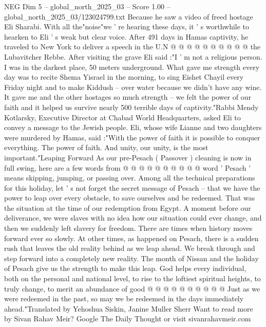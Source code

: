 \begin{textsample}{NEG Dim 5 – global\_north\_2025\_03 – Score 1.00 – global\_north\_2025\_03/123024799.txt}
Because he saw a video of freed hostage Eli Sharabi.
With all the"noise"we ' re hearing these days, it ' s worthwhile to hearken to Eli ' s weak but clear voice.
After 491 days in Hamas captivity, he traveled to New York to deliver a speech in the U.N @ @ @ @ @ @ @ @ @ @ the Lubavitcher Rebbe.
After visiting the grave Eli said :"I ' m not a religious person.
I was in the darkest place, 50 meters underground.
What gave me strength every day was to recite Shema Yisrael in the morning, to sing Eishet Chayil every Friday night and to make Kiddush -- over water because we didn't have any wine.
It gave me and the other hostages so much strength -- we felt the power of our faith and it helped us survive nearly 500 terrible days of captivity."Rabbi Mendy Kotlarsky, Executive Director at Chabad World Headquarters, asked Eli to convey a message to the Jewish people.
Eli, whose wife Lianne and two daughters were murdered by Hamas, said :"With the power of faith it is possible to conquer everything.
The power of faith.
And unity, our unity, is the most important."Leaping Forward As our pre-Pesach ( Passover ) cleaning is now in full swing, here are a few words from @ @ @ @ @ @ @ @ @ @ word ' Pesach ' means skipping, jumping, or passing over.
Among all the technical preparations for this holiday, let ' s not forget the secret message of Pesach -- that we have the power to leap over every obstacle, to save ourselves and be redeemed.
That was the situation at the time of our redemption from Egypt.
A moment before our deliverance, we were slaves with no idea how our situation could ever change, and then we suddenly left slavery for freedom.
There are times when history moves forward ever so slowly.
At other times, as happened on Pesach, there is a sudden rush that leaves the old reality behind as we leap ahead.
We break through and step forward into a completely new reality.
The month of Nissan and the holiday of Pesach give us the strength to make this leap.
God helps every individual, both on the personal and national level, to rise to the loftiest spiritual heights, to truly change, to merit an abundance of good @ @ @ @ @ @ @ @ @ @ Just as we were redeemed in the past, so may we be redeemed in the days immediately ahead."Translated by Yehoshua Siskin, Janine Muller Sherr Want to read more by Sivan Rahav Meir?
Google The Daily Thought or visit sivanrahavmeir.com

\end{textsample}
